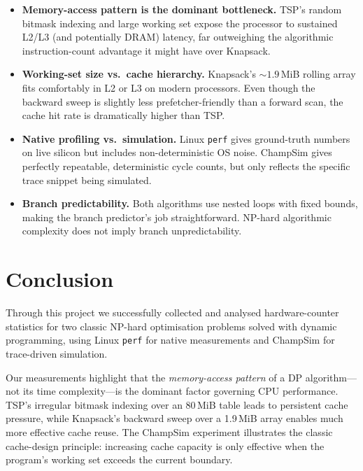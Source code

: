 \documentclass[11pt,a4paper]{article}
\begin{document}
\begin{itemize}[leftmargin=*]
    \item \textbf{Memory-access pattern is the dominant bottleneck.}
          TSP's random bitmask indexing and large working set expose the
          processor to sustained L2/L3 (and potentially DRAM) latency,
          far outweighing the algorithmic instruction-count advantage it
          might have over Knapsack.

    \item \textbf{Working-set size vs.\ cache hierarchy.}
          Knapsack's ${\sim}1.9$\,MiB rolling array fits comfortably in L2
          or L3 on modern processors.  Even though the backward sweep is
          slightly less prefetcher-friendly than a forward scan, the cache
          hit rate is dramatically higher than TSP.

    \item \textbf{Native profiling vs.\ simulation.}
          Linux \texttt{perf} gives ground-truth numbers on live silicon but
          includes non-deterministic OS noise.  ChampSim gives perfectly
          repeatable, deterministic cycle counts, but only reflects the
          specific trace snippet being simulated.

    \item \textbf{Branch predictability.}
          Both algorithms use nested loops with fixed bounds, making the
          branch predictor's job straightforward.  NP-hard algorithmic
          complexity does not imply branch unpredictability.
\end{itemize}

\section{Conclusion}

Through this project we successfully collected and analysed hardware-counter
statistics for two classic NP-hard optimisation problems solved with dynamic
programming, using Linux \texttt{perf} for native measurements and ChampSim
for trace-driven simulation.

Our measurements highlight that the \emph{memory-access pattern} of a DP
algorithm—not its time complexity—is the dominant factor governing CPU
performance.  TSP's irregular bitmask indexing over an 80\,MiB table leads
to persistent cache pressure, while Knapsack's backward sweep over a
1.9\,MiB array enables much more effective cache reuse.  The ChampSim
experiment illustrates the classic cache-design principle: increasing cache
capacity is only effective when the program's working set exceeds the current
boundary.
\end{document}
